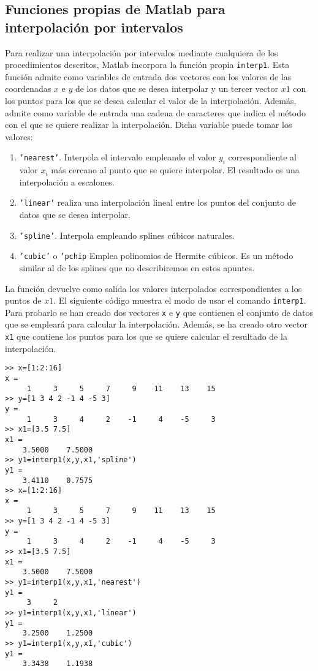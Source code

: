  
\subsection{Funciones propias de Matlab para interpolación por intervalos} 

Para realizar una interpolación por intervalos mediante cualquiera de los procedimientos descritos, Matlab incorpora la función propia \texttt{interp1}. Esta función admite como variables de entrada dos vectores con los valores de las coordenadas $x$ e $y$ de los datos que se desea interpolar y un tercer vector $x1$ con los puntos para los que se desea calcular el valor de la interpolación. Además, admite como variable  de entrada una cadena de caracteres que indica el método con el que se quiere realizar la interpolación. Dicha variable puede tomar los valores:
\begin{enumerate}
\item \texttt{'nearest'}. Interpola el intervalo empleando el valor $y_i$ correspondiente al valor  $x_i$ más cercano al punto que se quiere interpolar. El resultado es una interpolación a escalones.
\item \texttt{'linear'} realiza una interpolación lineal entre los puntos del conjunto de datos que se desea interpolar.
\item \texttt{'spline'}. Interpola empleando splines cúbicos naturales.
\item \texttt{'cubic'} o \texttt{'pchip} Emplea polinomios de Hermite cúbicos. Es un método similar al de los splines que no describiremos en estos apuntes.
\end{enumerate} 

La función devuelve como salida los valores interpolados correspondientes a los puntos de $x1$. El siguiente código muestra el modo de usar el comando \texttt{interp1}. Para probarlo se han creado dos vectores \texttt{x} e \texttt{y} que contienen el conjunto de datos que se empleará para calcular la interpolación. Además, se ha creado otro vector \texttt{x1} que contiene los puntos para los que se quiere calcular el resultado de la interpolación.

\begin{verbatim}
>> x=[1:2:16]
x =
     1     3     5     7     9    11    13    15
>> y=[1 3 4 2 -1 4 -5 3]
y =
     1     3     4     2    -1     4    -5     3
>> x1=[3.5 7.5]
x1 =
    3.5000    7.5000
>> y1=interp1(x,y,x1,'spline')
y1 =
    3.4110    0.7575
>> x=[1:2:16]
x =
     1     3     5     7     9    11    13    15
>> y=[1 3 4 2 -1 4 -5 3]
y =
     1     3     4     2    -1     4    -5     3
>> x1=[3.5 7.5]
x1 =
    3.5000    7.5000
>> y1=interp1(x,y,x1,'nearest')
y1 =
     3     2
>> y1=interp1(x,y,x1,'linear')
y1 =
    3.2500    1.2500
>> y1=interp1(x,y,x1,'cubic')
y1 =
    3.3438    1.1938
\end{verbatim}


